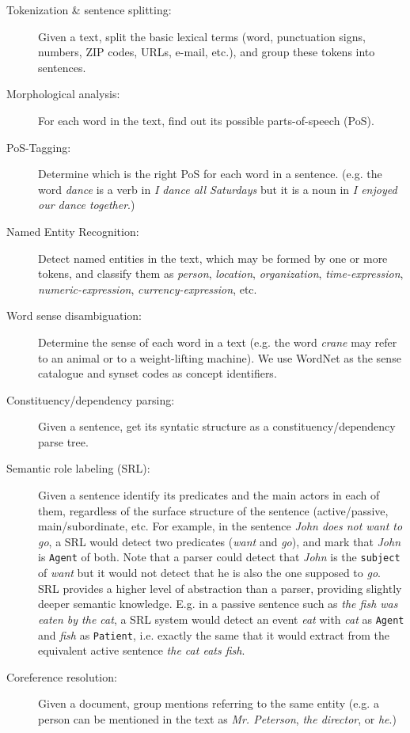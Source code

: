 \begin{description}
\item[Tokenization \& sentence splitting:] Given a text, split the basic lexical
  terms (word, punctuation signs, numbers, ZIP codes, URLs, e-mail, etc.), and
  group these tokens into sentences.
\item[Morphological analysis:] For each word in the text, find out its possible
  parts-of-speech (PoS).
\item[PoS-Tagging:] Determine which is the right PoS for each word in a
  sentence. (e.g. the word \textit{dance} is a verb in \textit{I dance all
    Saturdays} but it is a noun in \textit{I enjoyed our dance together}.)
\item[Named Entity Recognition:] Detect named entities in the text, which may be
  formed by one or more tokens, and classify them as \textit{person},
  \textit{location}, \textit{organization}, \textit{time-expression},
  \textit{numeric-expression}, \textit{currency-expression}, etc.
\item[Word sense disambiguation:] Determine the sense of each word in a text
  (e.g. the word \textit{crane} may refer to an animal or to a weight-lifting
  machine). We use WordNet \cite{fellbaum98} as the sense catalogue and synset
  codes as concept identifiers.
\item[Constituency/dependency parsing:] Given a sentence, get its syntatic
  structure as a constituency/dependency parse tree.
\item[Semantic role labeling (SRL):] Given a sentence identify its predicates and the
  main actors in each of them, regardless of the surface structure of the
  sentence (active/passive, main/subordinate, etc. For example, in the sentence
  \textit{John does not want to go}, a SRL would detect two predicates
  (\textit{want} and \textit{go}), and mark that \textit{John} is \texttt{Agent}
  of both. Note that a parser could detect that \textit{John} is the
  \texttt{subject} of \textit{want} but it would not detect that he is also the
  one supposed to \textit{go}.  SRL provides a higher level of abstraction than
  a parser, providing slightly deeper semantic knowledge. E.g. in a passive
  sentence such as \textit{the fish was eaten by the cat}, a SRL system would
  detect an event \textit{eat} with \textit{cat} as \texttt{Agent} and
  \textit{fish} as \texttt{Patient}, i.e. exactly the same that it would extract
  from the equivalent active sentence \textit{the cat eats fish}.
  

\item[Coreference resolution:] Given a document, group mentions referring to the same entity (e.g. a person can be mentioned in the text as \textit{Mr. Peterson}, \textit{the director}, or \textit{he}.) 
\end{description}

